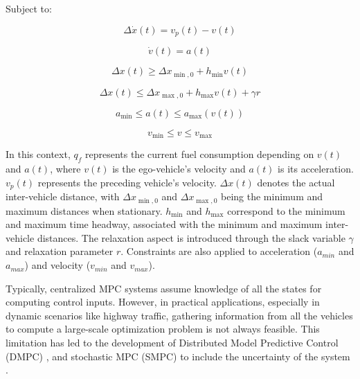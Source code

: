 Subject to:

\begin{equation}
\Delta \dot{x}(t) = v_{p}(t) - v(t)
\end{equation}

\begin{equation}
\dot{v}(t) = a(t)
\end{equation}

\begin{equation}
\Delta x(t) \geq \Delta x_{\min , 0}+h_{\min } v(t)
\end{equation}

\begin{equation}
\Delta x(t) \leq \Delta x_{\max , 0}+h_{\max } v(t)+\gamma r
\end{equation}

\begin{equation}
a_{\min} \leq a(t) \leq a_{\max }(v(t))
\end{equation}

\begin{equation}
v_{\min} \leq v \leq v_{\max }
\end{equation}

In this context, $q_f$ represents the current fuel consumption depending on $v(t)$ and $a(t)$, where $v(t)$ is the ego-vehicle's velocity and $a(t)$ is its acceleration. $v_{p}(t)$ represents the preceding vehicle's velocity. $\Delta x(t)$ denotes the actual inter-vehicle distance, with $\Delta x_{\min , 0}$ and $\Delta x_{\max , 0}$ being the minimum and maximum distances when stationary. $h_{\min }$ and $h_{\max }$ correspond to the minimum and maximum time headway, associated with the minimum and maximum inter-vehicle distances. The relaxation aspect is introduced through the slack variable $\gamma$ and relaxation parameter $r$. Constraints are also applied to acceleration ($a_{min}$ and $a_{max}$) and velocity ($v_{min}$ and $v_{max}$).


Typically, centralized MPC systems assume knowledge of all the states for computing control inputs. However, in practical applications, especially in dynamic scenarios like highway traffic, gathering information from all the vehicles to compute a large-scale optimization problem is not always feasible. This limitation has led to the development of Distributed Model Predictive Control (DMPC) \cite{caruntu2016distributed}\cite{negenborn2014distributed}, and stochastic MPC (SMPC) to include the uncertainty of the system \cite{moser2015cooperative}.





